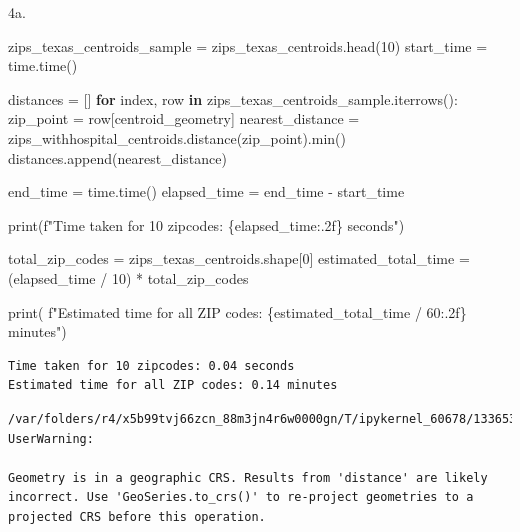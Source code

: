 \documentclass[
  letterpaper,
  DIV=11,
  numbers=noendperiod]{scrartcl}
\newenvironment{Shaded}{\begin{snugshade}}{\end{snugshade}}
\newcommand{\BuiltInTok}[1]{\textcolor[rgb]{0.00,0.23,0.31}{#1}}
\newcommand{\ControlFlowTok}[1]{\textcolor[rgb]{0.00,0.23,0.31}{\textbf{#1}}}
\newcommand{\DecValTok}[1]{\textcolor[rgb]{0.68,0.00,0.00}{#1}}
\newcommand{\KeywordTok}[1]{\textcolor[rgb]{0.00,0.23,0.31}{\textbf{#1}}}
\newcommand{\NormalTok}[1]{\textcolor[rgb]{0.00,0.23,0.31}{#1}}
\newcommand{\OperatorTok}[1]{\textcolor[rgb]{0.37,0.37,0.37}{#1}}
\newcommand{\SpecialCharTok}[1]{\textcolor[rgb]{0.37,0.37,0.37}{#1}}
\newcommand{\SpecialStringTok}[1]{\textcolor[rgb]{0.13,0.47,0.30}{#1}}
\newcommand{\StringTok}[1]{\textcolor[rgb]{0.13,0.47,0.30}{#1}}
\begin{document}
4a.

\begin{Shaded}
\begin{Highlighting}[]
\NormalTok{zips\_texas\_centroids\_sample }\OperatorTok{=}\NormalTok{ zips\_texas\_centroids.head(}\DecValTok{10}\NormalTok{)}
\NormalTok{start\_time }\OperatorTok{=}\NormalTok{ time.time()}

\NormalTok{distances }\OperatorTok{=}\NormalTok{ []}
\ControlFlowTok{for}\NormalTok{ index, row }\KeywordTok{in}\NormalTok{ zips\_texas\_centroids\_sample.iterrows():}
\NormalTok{    zip\_point }\OperatorTok{=}\NormalTok{ row[}\StringTok{\textquotesingle{}centroid\_geometry\textquotesingle{}}\NormalTok{]}
\NormalTok{    nearest\_distance }\OperatorTok{=}\NormalTok{ zips\_withhospital\_centroids.distance(zip\_point).}\BuiltInTok{min}\NormalTok{()}
\NormalTok{    distances.append(nearest\_distance)}

\NormalTok{end\_time }\OperatorTok{=}\NormalTok{ time.time()}
\NormalTok{elapsed\_time }\OperatorTok{=}\NormalTok{ end\_time }\OperatorTok{{-}}\NormalTok{ start\_time}

\BuiltInTok{print}\NormalTok{(}\SpecialStringTok{f"Time taken for 10 zipcodes: }\SpecialCharTok{\{}\NormalTok{elapsed\_time}\SpecialCharTok{:.2f\}}\SpecialStringTok{ seconds"}\NormalTok{)}

\NormalTok{total\_zip\_codes }\OperatorTok{=}\NormalTok{ zips\_texas\_centroids.shape[}\DecValTok{0}\NormalTok{]}
\NormalTok{estimated\_total\_time }\OperatorTok{=}\NormalTok{ (elapsed\_time }\OperatorTok{/} \DecValTok{10}\NormalTok{) }\OperatorTok{*}\NormalTok{ total\_zip\_codes}

\BuiltInTok{print}\NormalTok{(}
    \SpecialStringTok{f"Estimated time for all ZIP codes: }\SpecialCharTok{\{}\NormalTok{estimated\_total\_time }\OperatorTok{/} \DecValTok{60}\SpecialCharTok{:.2f\}}\SpecialStringTok{ minutes"}\NormalTok{)}
\end{Highlighting}
\end{Shaded}

\begin{verbatim}
Time taken for 10 zipcodes: 0.04 seconds
Estimated time for all ZIP codes: 0.14 minutes
\end{verbatim}

\begin{verbatim}
/var/folders/r4/x5b99tvj66zcn_88m3jn4r6w0000gn/T/ipykernel_60678/1336534691.py:7: UserWarning:

Geometry is in a geographic CRS. Results from 'distance' are likely incorrect. Use 'GeoSeries.to_crs()' to re-project geometries to a projected CRS before this operation.

\end{verbatim}
\end{document}
